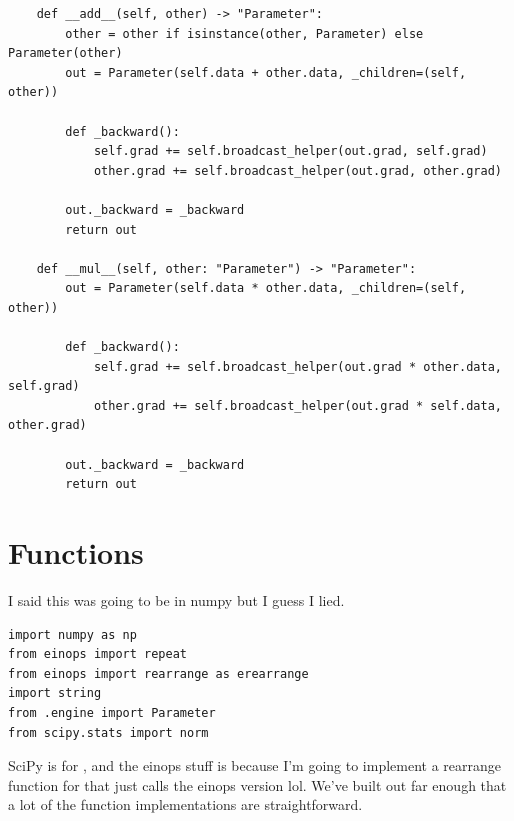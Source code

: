 \documentclass[11pt]{article}
\begin{document}
\begin{verbatim}
    def __add__(self, other) -> "Parameter":
        other = other if isinstance(other, Parameter) else Parameter(other)
        out = Parameter(self.data + other.data, _children=(self, other))

        def _backward():
            self.grad += self.broadcast_helper(out.grad, self.grad)
            other.grad += self.broadcast_helper(out.grad, other.grad)

        out._backward = _backward
        return out

    def __mul__(self, other: "Parameter") -> "Parameter":
        out = Parameter(self.data * other.data, _children=(self, other))

        def _backward():
            self.grad += self.broadcast_helper(out.grad * other.data, self.grad)
            other.grad += self.broadcast_helper(out.grad * self.data, other.grad)

        out._backward = _backward
        return out
\end{verbatim}
\section{Functions}
I said this was going to be in numpy but I guess I lied. 
\begin{verbatim}
import numpy as np
from einops import repeat
from einops import rearrange as erearrange
import string
from .engine import Parameter
from scipy.stats import norm
\end{verbatim}
SciPy is for , and the einops stuff is because I'm going to implement a rearrange function for 
 that just calls the einops version lol. We've built out far enough that a lot of the function
implementations are straightforward. 
\end{document}
